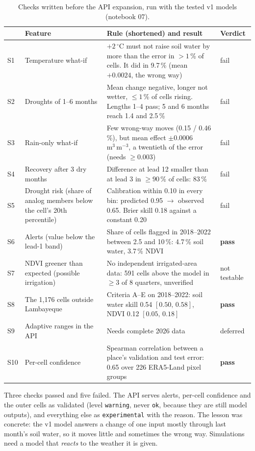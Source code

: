 \documentclass[11pt,a4paper]{article}
\newcommand{\sm}{\ensuremath{\mathrm{m^3\,m^{-3}}}}
\newcommand{\ci}[2]{\ensuremath{[#1,\,#2]}}
\begin{document}
\begin{table}[H]
\centering\small
\caption{Checks written before the API expansion, run with the tested v1 models (notebook 07).}
\label{tab:checks}
\begin{tabularx}{\textwidth}{l>{\raggedright\arraybackslash}p{3.3cm}>{\raggedright\arraybackslash}Xl}
\toprule
& Feature & Rule (shortened) and result & Verdict \\
\midrule
S1 & Temperature what-if & $+2\,^\circ$C must not raise soil water by more than the error in $>1$\,\% of cells. It did in 9.7\,\% (mean $+0.0024$, the wrong way) & fail \\
S2 & Droughts of 1--6 months & Mean change negative, longer not wetter, $\le1$\,\% of cells rising. Lengths 1--4 pass; 5 and 6 months reach 1.4 and 2.5\,\% & fail \\
S3 & Rain-only what-if & Few wrong-way moves (0.15 / 0.46\,\%), but mean effect $\pm0.0006$\,\sm, a twentieth of the error (needs $\ge0.003$) & fail \\
S4 & Recovery after 3 dry months & Difference at lead 12 smaller than at lead 3 in $\ge90$\,\% of cells: 83\,\% & fail \\
S5 & Drought risk (share of analog members below the cell's 20th percentile) & Calibration within 0.10 in every bin: predicted 0.95 $\to$ observed 0.65. Brier skill 0.18 against a constant 0.20 & fail \\
S6 & Alerts (value below the lead-1 band) & Share of cells flagged in 2018--2022 between 2.5 and 10\,\%: 4.7\,\% soil water, 3.7\,\% NDVI & \textbf{pass} \\
S7 & NDVI greener than expected (possible irrigation) & No independent irrigated-area data: 591 cells above the model in $\ge3$ of 8 quarters, unverified & not testable \\
S8 & The 1,176 cells outside Lambayeque & Criteria A--E on 2018--2022: soil water skill 0.54 \ci{0.50}{0.58}, NDVI 0.12 \ci{0.05}{0.18} & \textbf{pass} \\
S9 & Adaptive ranges in the API & Needs complete 2026 data & deferred \\
S10 & Per-cell confidence & Spearman correlation between a place's validation and test error: 0.65 over 226 ERA5-Land pixel groups & \textbf{pass} \\
\bottomrule
\end{tabularx}
\end{table}

Three checks passed and five failed. The API serves alerts, per-cell confidence and the outer cells as validated (level
\texttt{warning}, never \texttt{ok}, because they are still model outputs), and everything else as
\texttt{experimental} with the reason. The lesson was concrete: the v1 model answers a change of one input mostly through
last month's soil water, so it moves little and sometimes the wrong way. Simulations need a model that \emph{reacts} to
the weather it is given.
\end{document}
